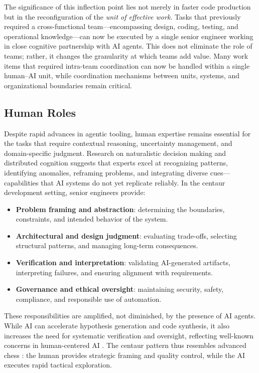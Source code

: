 \documentclass[11pt, a4paper, twocolumn]{article} %
\begin{document}
The significance of this inflection point lies not merely in faster code
production but in the reconfiguration of the \emph{unit of effective work}.
Tasks that previously required a cross-functional team---encompassing design,
coding, testing, and operational knowledge---can now be executed by a single
senior engineer working in close cognitive partnership with AI agents. This
does not eliminate the role of teams; rather, it changes the granularity at
which teams add value. Many work items that required intra-team coordination
can now be handled within a single human--AI unit, while coordination
mechanisms between units, systems, and organizational boundaries remain
critical.

\clearpage

\subsection*{Human Roles}

Despite rapid advances in agentic tooling, human expertise remains essential for
the tasks that require contextual reasoning, uncertainty management, and
domain-specific judgment. Research on naturalistic decision making
\citep{klein2008} and distributed cognition \citep{hutchins1995} suggests that
experts excel at recognizing patterns, identifying anomalies, reframing
problems, and integrating diverse cues---capabilities that AI systems do not
yet replicate reliably. In the centaur development setting, senior engineers
provide:

\begin{itemize}
    \item \textbf{Problem framing and abstraction}: determining the boundaries,
    constraints, and intended behavior of the system.
    \item \textbf{Architectural and design judgment}: evaluating trade-offs,
    selecting structural patterns, and managing long-term consequences.
    \item \textbf{Verification and interpretation}: validating AI-generated
    artifacts, interpreting failures, and ensuring alignment with requirements.
    \item \textbf{Governance and ethical oversight}: maintaining security,
    safety, compliance, and responsible use of automation.
\end{itemize}

These responsibilities are amplified, not diminished, by the presence of AI
agents. While AI can accelerate hypothesis generation and code synthesis, it
also increases the need for systematic verification and oversight, reflecting
well-known concerns in human-centered AI \citep{shneiderman2020human}. The
centaur pattern thus resembles advanced chess \citep{kasparovadvancedchess}:
the human provides strategic framing and quality control, while the AI executes
rapid tactical exploration.
\end{document}
